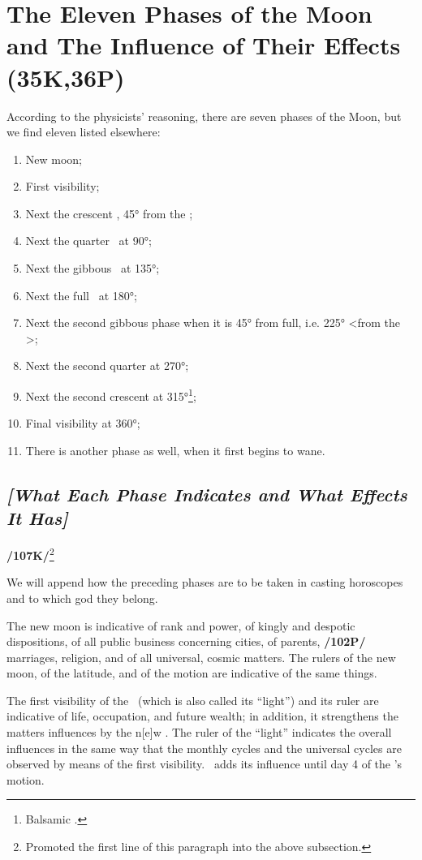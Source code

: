 \section{The Eleven Phases of the Moon and The Influence of Their Effects (35K,36P)}

According to the physicists’ reasoning, there are seven phases of the Moon, but we find eleven listed elsewhere:

\begin{enumerate}
\item New moon;
\item First visibility;
\item Next the crescent \Moon, 45° from the \Sun;
\item Next the quarter \Moon\, at 90°;
\item Next the gibbous \Moon\, at 135°;
\item Next the full \Moon\, at 180°;
\item Next the second gibbous phase when it is 45° from full, i.e. 225° <from the \Sun>;
\item Next the second quarter at 270°;
\item Next the second crescent at 315°\footnote{Balsamic \Moon.};
\item Final visibility at 360°;
\item There is another phase as well, when it first begins to wane.
\end{enumerate}

 \subsection{\textit{[What Each Phase Indicates and What Effects It Has]}}

\textbf{/107K/}\footnote{Promoted the first line of this paragraph into the above subsection.} 

We will append how the preceding phases are to be taken in casting horoscopes and to which god they belong.

The new moon is indicative of rank and power, of kingly and despotic dispositions, of all public business concerning cities, of parents, \textbf{/102P/} marriages, religion, and of all universal, cosmic matters. The rulers of the new moon, of the latitude, and of the motion are indicative of the same things. 

The first visibility of the \Moon\, (which is also called its “light”) and its ruler are indicative of life, occupation, and future wealth; in addition, it strengthens the matters influences by the n[e]w \Moon. The ruler of the “light” indicates the overall influences in the same way that the monthly cycles and the universal cycles are observed by means of the first visibility. \Mercury\, adds its influence until day 4 of the \Moon’s motion.

